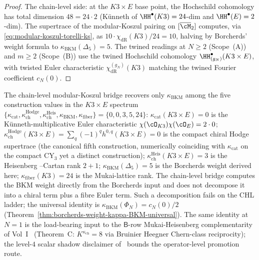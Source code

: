 \begin{proof}
The chain-level side: at the $K3 \times E$ base point, the Hochschild
cohomology has total dimension $48 = 24 \cdot 2$ (K\"unneth of
$\HH^\bullet(K3) = 24$-dim and $\HH^\bullet(E) = 2$-dim). The
supertrace of the modular-Koszul pairing on $[\overline{\cM}_2]$
computes, via \eqref{eq:modular-koszul-torelli-ks}, as $10 \cdot
\chi_{\mathrm{dR}}(K3)/24 = 10$, halving by Borcherds' weight formula
to $\kappa_{\mathrm{BKM}}(\Delta_5) = 5$. The twined readings at $N \geq 2$
(Scope~(A)) and $m \geq 2$ (Scope~(B)) use the twined Hochschild
cohomology $\HH^\bullet_{(g_N)}(K3 \times E)$, with twisted Euler
characteristic $\chi^{(g_N)}_{\mathrm{dR}}(K3)$ matching the twined
Fourier coefficient $c_N(0)$.
\end{proof}

\begin{remark}
\label{rem:kBKM-chain-level-spectrum}
The chain-level modular-Koszul bridge recovers only
$\kappa_{\mathrm{BKM}}$ among the five construction values in the
$K3 \times E$ spectrum $\{\kappa_{\mathrm{cat}},
\kappa_{\mathrm{ch}}^{\mathrm{Hodge}},
\kappa_{\mathrm{ch}}^{\mathrm{Heis}}, \kappa_{\mathrm{BKM}},
\kappa_{\mathrm{fiber}}\} = \{0, 0, 3, 5, 24\}$:
$\kappa_{\mathrm{cat}}(K3 \times E) = 0$ is the K\"unneth-multiplicative
Euler characteristic $\chi(\cO_{K3}) \chi(\cO_E) = 2 \cdot 0$;
$\kappa_{\mathrm{ch}}^{\mathrm{Hodge}}(K3 \times E) =
\sum_q (-1)^q h^{0,q}(K3 \times E) = 0$ is the compact chiral Hodge
supertrace (the canonical fifth construction, numerically coinciding
with $\kappa_{\mathrm{cat}}$ on the compact CY$_3$ yet a distinct
construction);
$\kappa_{\mathrm{ch}}^{\mathrm{Heis}}(K3 \times E) = 3$ is the Heisenberg
--Cartan rank $2 + 1$; $\kappa_{\mathrm{BKM}}(\Delta_5) = 5$
is the Borcherds weight derived here; $\kappa_{\mathrm{fiber}}(K3) = 24$
is the Mukai-lattice rank. The chain-level bridge computes the BKM
weight directly from the Borcherds input and does not decompose it
into a chiral term plus a fibre Euler term. Such a decomposition fails
on the CHL ladder; the universal identity is
$\kappa_{\mathrm{BKM}}(\Phi_N) = c_N(0)/2$
(Theorem~\ref{thm:borcherds-weight-kappa-BKM-universal}). The same
identity at $N = 1$ is the load-bearing input to the
$\mathsf{B}$-row Mukai-Heisenberg complementarity of
Vol~I~\cite{VolI} (Theorem~C: $K^{\kappa_{\mathrm{ch}}} = 8$ via
Bruinier Heegner Chern-class reciprocity); the level-$4$ scalar
shadow disclaimer of~\cite{LorgatIgusaCuspForm} bounds the
operator-level promotion route.
\end{remark}

